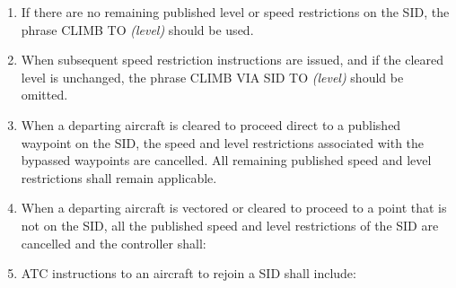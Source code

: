 \begin{enumeratesc}
\begin{enumerate}

        \item If there are no remaining published level or speed restrictions on the SID, the phrase CLIMB TO \textit{(level)} should be used.
        \item When subsequent speed restriction instructions are issued, and if the cleared level is unchanged, the phrase CLIMB VIA SID TO \textit{(level)} should be omitted.
        \item When a departing aircraft is cleared to proceed direct to a published waypoint on the SID, the speed and level restrictions associated with the bypassed waypoints are cancelled. All remaining published speed and level restrictions shall remain applicable.
        \item \label{6.3.2.4.5} When a departing aircraft is vectored or cleared to proceed to a point that is not on the SID, all the published speed and level restrictions of the SID are cancelled and the controller shall:

        

        \item ATC instructions to an aircraft to rejoin a SID shall include:


\end{enumerate}
\end{enumeratesc}
